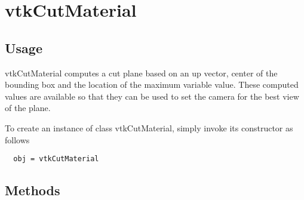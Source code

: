 \section{vtkCutMaterial}

\subsection{Usage}

 vtkCutMaterial computes a cut plane based on an up vector, center of the bounding box
 and the location of the maximum variable value.
  These computed values are available so that they can be used to set the camera
 for the best view of the plane.

To create an instance of class vtkCutMaterial, simply
invoke its constructor as follows
\begin{verbatim}
  obj = vtkCutMaterial
\end{verbatim}
\subsection{Methods}

